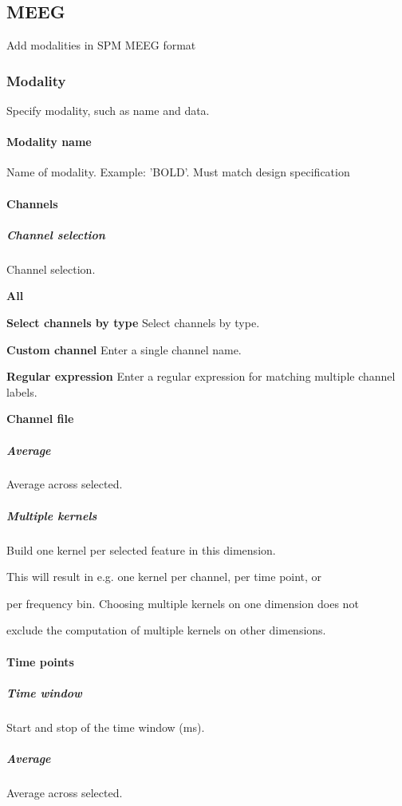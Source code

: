 \subsection{MEEG}
Add modalities in SPM MEEG format


\subsubsection{Modality}
Specify modality, such as name and data.


\paragraph{Modality name}
Name of modality. Example: 'BOLD'. Must match design specification


\paragraph{Channels}

\subparagraph{Channel selection}
Channel selection.


\textbf{All}



\textbf{Select channels by type}
Select channels by type.


\textbf{Custom channel}
Enter a single channel name.


\textbf{Regular expression}
Enter a regular expression for matching multiple channel labels.


\textbf{Channel file}



\subparagraph{Average}
Average across selected.


\subparagraph{Multiple kernels}
Build one kernel per selected feature in this dimension.

 This will result in e.g. one kernel per channel, per time point, or 

per frequency bin. Choosing multiple kernels on one dimension does not 

exclude the computation of multiple kernels on other dimensions.


\paragraph{Time points}

\subparagraph{Time window}
Start and stop of the time window (ms).


\subparagraph{Average}
Average across selected.


